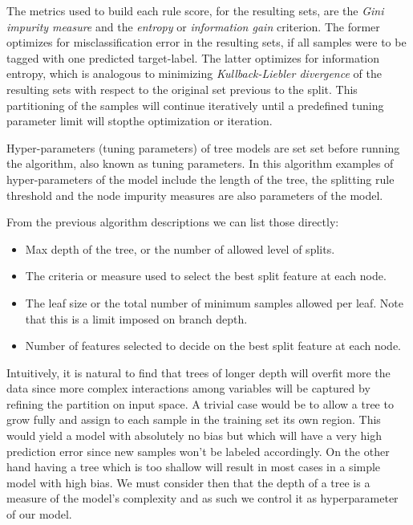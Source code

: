 \documentclass{article}%
\theoremstyle{definition}
\begin{document}
\smallskip



The metrics used to build each rule score, for the resulting sets, are the \textit{Gini impurity measure} and the \textit{entropy} or \textit{information gain} criterion. The former optimizes for misclassification error in the resulting sets, if all samples were to be tagged with one predicted target-label.  The latter optimizes for information entropy, which is analogous to minimizing \textit{Kullback-Liebler divergence} of the resulting sets with respect to the original set previous to the split. This partitioning of the samples will continue iteratively until a predefined tuning parameter limit will stopthe optimization or iteration.


Hyper-parameters (tuning parameters) of tree models are set set before running the algorithm, also known as tuning parameters. In this algorithm examples of hyper-parameters of the model include the length of the tree,  the splitting rule threshold and the node impurity measures are also parameters of the model. 

From the previous algorithm descriptions we can list those directly:

\begin{itemize}
	\item Max depth of the tree, or the number of allowed level of splits.
	\item The criteria or measure used to select the best split feature at each node.
	\item The leaf size or the total number of minimum samples allowed per leaf. Note that this is a limit imposed on  branch depth. 
	\item Number of features selected to decide on the best split feature at each node.
\end{itemize}


Intuitively, it is natural to find that trees of longer depth will overfit more the data since more complex interactions among variables will be captured by refining the partition on input space. A trivial case would be to allow a tree to grow fully and assign to each sample in the training set its own region. This would yield a model with absolutely no bias but which will have a very high prediction error since new samples won't be labeled accordingly. On the other hand having a tree which is too shallow will result in most cases in a simple model with high bias. We must consider then that the depth of a tree is a measure of the model's complexity and as such we control it as hyperparameter of our model. 
\end{document}
